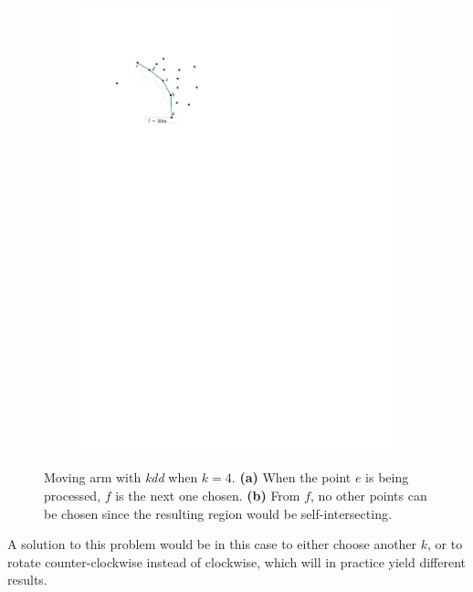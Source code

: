 \begin{figure}
\begin{subfigure}[b]{0.3\linewidth}
    \includegraphics[page=5,width=\textwidth]{figs/movingarm.pdf}
    \caption{}
  \end{subfigure}
\caption{Moving arm with \emph{kdd} when $k=4$. \textbf{(a)} When the point $e$ is being processed, $f$ is the next one chosen. \textbf{(b)} From $f$, no other points can be chosen since the resulting region would be self-intersecting.}
\label{fig:movingarm_kdd}
\end{figure}
A solution to this problem would be in this case to either choose another $k$, or to rotate counter-clockwise instead of clockwise, which will in practice yield different results.


%
